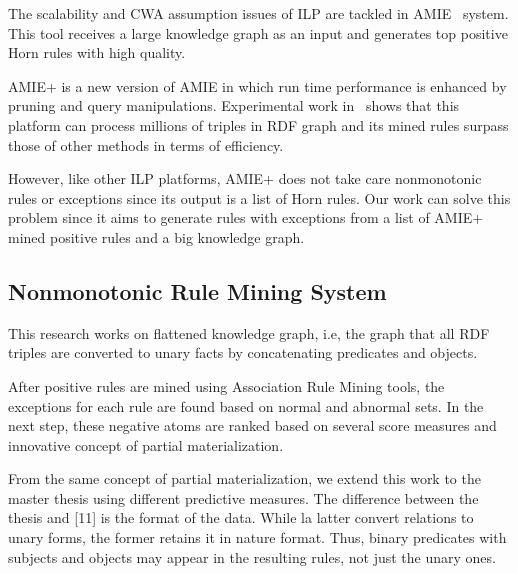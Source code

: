The scalability and CWA assumption issues of ILP are tackled in AMIE~\cite{ref10} system. This tool receives a large knowledge graph as an input and generates top positive Horn rules with high quality.

AMIE+ is a new version of AMIE in which run time performance is enhanced by pruning and query manipulations. Experimental work in~\cite{ref10} shows that this platform can process millions of triples in RDF graph and its mined rules surpass those of other methods in terms of efficiency.

However, like other ILP platforms, AMIE+ does not take care nonmonotonic rules or exceptions since its output is a list of Horn rules. Our work can solve this problem since it aims to generate rules with exceptions from a list of AMIE+ mined positive rules and a big knowledge graph.

\subsection{Nonmonotonic Rule Mining System}

This research works on flattened knowledge graph, i.e, the graph that all RDF triples are converted to unary facts by concatenating predicates and objects.

After positive rules are mined using Association Rule Mining tools, the exceptions for each rule are found based on normal and abnormal sets. In the next step, these negative atoms are ranked based on several score measures and innovative concept of partial materialization.

From the same concept of partial materialization, we extend this work to the master thesis using different predictive measures. The difference between the thesis and [11] is the format of the data. While la latter convert relations to unary forms, the former retains it in nature format. Thus, binary predicates with subjects and objects may appear in the resulting rules, not just the unary ones.